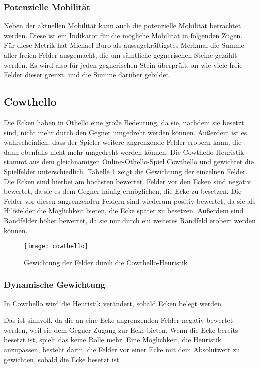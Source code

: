 \subsubsection{Potenzielle Mobilität}
\label{sec:potmobility}
Neben der aktuellen Mobilität kann auch die potenzielle Mobilität betrachtet werden. Diese ist ein Indikator für die
mögliche Mobilität in folgenden Zügen. Für diese Metrik hat Michael Buro als aussagekräftigstes Merkmal die Summe aller
freien Felder ausgemacht, die um sämtliche gegnerischen Steine gezählt werden. Es wird also für jeden gegnerischen Stein
überprüft, an wie viele freie Felder dieser grenzt, und die Summe darüber gebildet.
\cite[S.~8f.]{evaluationfunctions}

\subsection{Cowthello}
\label{sec:cowthello}
Die Ecken haben in Othello eine große Bedeutung, da sie, nachdem sie besetzt sind, nicht mehr durch den Gegner umgedreht
werden können. Außerdem ist es wahrscheinlich, dass der Spieler weitere angrenzende Felder erobern kann, die dann
ebenfalls nicht mehr umgedreht werden können. Die Cowthello-Heuristik stammt aus dem gleichnamigen Online-Othello-Spiel
Cowthello und gewichtet die Spielfelder unterschiedlich.
\cite{cowthello}
Tabelle \ref{fig:cowthello} zeigt die Gewichtung der einzelnen Felder. Die Ecken sind hierbei am höchsten bewertet.
Felder vor den Ecken sind negativ bewertet, da sie es dem Gegner häufig ermöglichen, die Ecke zu besetzen. Die Felder
vor diesen angrenzenden Feldern sind wiederum positiv bewertet, da sie als Hilfsfelder die Möglichkeit bieten, die Ecke
später zu besetzen. Außerdem sind Randfelder höher bewertet, da sie nur durch ein weiteres Randfeld erobert werden
können.

\begin{figure}[H]
    \centering
    \texttt{[image: cowthello]}
    \caption{Gewichtung der Felder durch die Cowthello-Heuristik}
    \label{fig:cowthello}
\end{figure}

\subsubsection{Dynamische Gewichtung}
In Cowthello wird die Heuristik verändert, sobald Ecken belegt werden.
\cite{cowthello}

Das ist sinnvoll, da die an eine Ecke angrenzenden Felder negativ bewertet werden, weil sie dem Gegner Zugang zur Ecke
bieten. Wenn die Ecke bereits besetzt ist, spielt das keine Rolle mehr. Eine Möglichkeit, die Heuristik anzupassen,
besteht darin, die Felder vor einer Ecke mit dem Absolutwert zu gewichten, sobald die Ecke besetzt ist.
